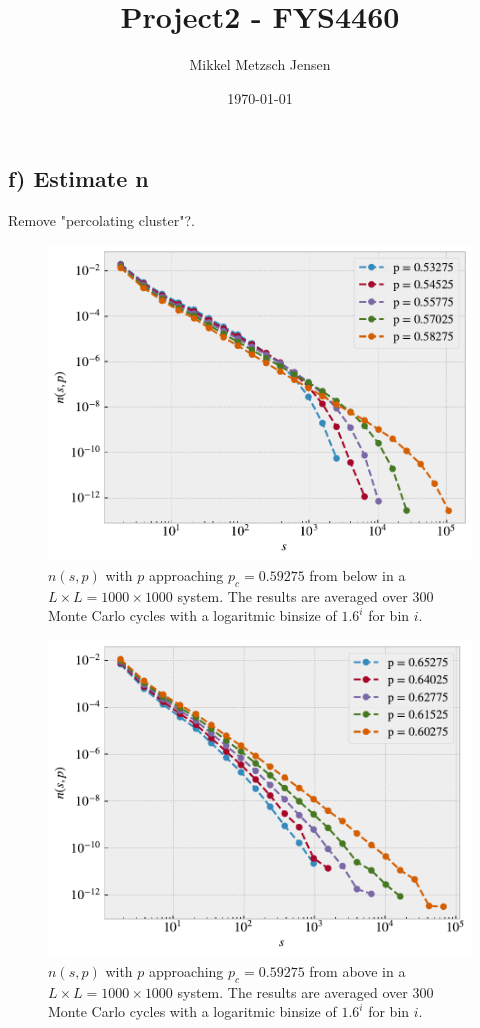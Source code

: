 \documentclass[reprint, amsmath, amssymb, aps]{revtex4-2}
\begin{document}
\title{Project2 - FYS4460}
\author{Mikkel Metzsch Jensen}

\date{\today}
\maketitle

\subsection*{f) Estimate n}
Remove "percolating cluster"?.



\begin{figure}[H]
  \includegraphics[width=\linewidth]{figures/f_p_below.pdf}
  \caption{$n(s,p)$ with $p$ approaching $p_c = 0.59275$ from below in a $L \times L = 1000 \times 1000$ system. The results are averaged over 300 Monte Carlo cycles with a logaritmic binsize of $1.6^i$ for bin $i$.}
  \label{fig:f}
\end{figure}

\begin{figure}[H]
  \includegraphics[width=\linewidth]{figures/f_p_above.pdf}
  \caption{$n(s,p)$ with $p$ approaching $p_c = 0.59275$ from above in a $L \times L = 1000 \times 1000$ system. The results are averaged over 300 Monte Carlo cycles with a logaritmic binsize of $1.6^i$ for bin $i$.}
  \label{fig:f}
\end{figure}
\end{document}
